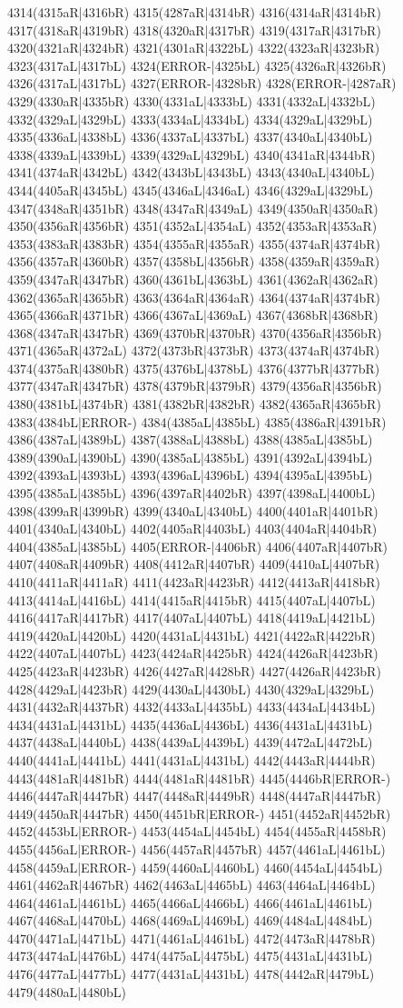 4314(4315aR|4316bR) 4315(4287aR|4314bR) 4316(4314aR|4314bR) 4317(4318aR|4319bR) 4318(4320aR|4317bR) 4319(4317aR|4317bR) 4320(4321aR|4324bR) 4321(4301aR|4322bL) 4322(4323aR|4323bR) 4323(4317aL|4317bL) 4324(ERROR-|4325bL) 4325(4326aR|4326bR) 4326(4317aL|4317bL) 4327(ERROR-|4328bR) 4328(ERROR-|4287aR) 4329(4330aR|4335bR) 4330(4331aL|4333bL) 4331(4332aL|4332bL) 4332(4329aL|4329bL) 4333(4334aL|4334bL) 4334(4329aL|4329bL) 4335(4336aL|4338bL) 4336(4337aL|4337bL) 4337(4340aL|4340bL) 4338(4339aL|4339bL) 4339(4329aL|4329bL) 4340(4341aR|4344bR) 4341(4374aR|4342bL) 4342(4343bL|4343bL) 4343(4340aL|4340bL) 4344(4405aR|4345bL) 4345(4346aL|4346aL) 4346(4329aL|4329bL) 4347(4348aR|4351bR) 4348(4347aR|4349aL) 4349(4350aR|4350aR) 4350(4356aR|4356bR) 4351(4352aL|4354aL) 4352(4353aR|4353aR) 4353(4383aR|4383bR) 4354(4355aR|4355aR) 4355(4374aR|4374bR) 4356(4357aR|4360bR) 4357(4358bL|4356bR) 4358(4359aR|4359aR) 4359(4347aR|4347bR) 4360(4361bL|4363bL) 4361(4362aR|4362aR) 4362(4365aR|4365bR) 4363(4364aR|4364aR) 4364(4374aR|4374bR) 4365(4366aR|4371bR) 4366(4367aL|4369aL) 4367(4368bR|4368bR) 4368(4347aR|4347bR) 4369(4370bR|4370bR) 4370(4356aR|4356bR) 4371(4365aR|4372aL) 4372(4373bR|4373bR) 4373(4374aR|4374bR) 4374(4375aR|4380bR) 4375(4376bL|4378bL) 4376(4377bR|4377bR) 4377(4347aR|4347bR) 4378(4379bR|4379bR) 4379(4356aR|4356bR) 4380(4381bL|4374bR) 4381(4382bR|4382bR) 4382(4365aR|4365bR) 4383(4384bL|ERROR-) 4384(4385aL|4385bL) 4385(4386aR|4391bR) 4386(4387aL|4389bL) 4387(4388aL|4388bL) 4388(4385aL|4385bL) 4389(4390aL|4390bL) 4390(4385aL|4385bL) 4391(4392aL|4394bL) 4392(4393aL|4393bL) 4393(4396aL|4396bL) 4394(4395aL|4395bL) 4395(4385aL|4385bL) 4396(4397aR|4402bR) 4397(4398aL|4400bL) 4398(4399aR|4399bR) 4399(4340aL|4340bL) 4400(4401aR|4401bR) 4401(4340aL|4340bL) 4402(4405aR|4403bL) 4403(4404aR|4404bR) 4404(4385aL|4385bL) 4405(ERROR-|4406bR) 4406(4407aR|4407bR) 4407(4408aR|4409bR) 4408(4412aR|4407bR) 4409(4410aL|4407bR) 4410(4411aR|4411aR) 4411(4423aR|4423bR) 4412(4413aR|4418bR) 4413(4414aL|4416bL) 4414(4415aR|4415bR) 4415(4407aL|4407bL) 4416(4417aR|4417bR) 4417(4407aL|4407bL) 4418(4419aL|4421bL) 4419(4420aL|4420bL) 4420(4431aL|4431bL) 4421(4422aR|4422bR) 4422(4407aL|4407bL) 4423(4424aR|4425bR) 4424(4426aR|4423bR) 4425(4423aR|4423bR) 4426(4427aR|4428bR) 4427(4426aR|4423bR) 4428(4429aL|4423bR) 4429(4430aL|4430bL) 4430(4329aL|4329bL) 4431(4432aR|4437bR) 4432(4433aL|4435bL) 4433(4434aL|4434bL) 4434(4431aL|4431bL) 4435(4436aL|4436bL) 4436(4431aL|4431bL) 4437(4438aL|4440bL) 4438(4439aL|4439bL) 4439(4472aL|4472bL) 4440(4441aL|4441bL) 4441(4431aL|4431bL) 4442(4443aR|4444bR) 4443(4481aR|4481bR) 4444(4481aR|4481bR) 4445(4446bR|ERROR-) 4446(4447aR|4447bR) 4447(4448aR|4449bR) 4448(4447aR|4447bR) 4449(4450aR|4447bR) 4450(4451bR|ERROR-) 4451(4452aR|4452bR) 4452(4453bL|ERROR-) 4453(4454aL|4454bL) 4454(4455aR|4458bR) 4455(4456aL|ERROR-) 4456(4457aR|4457bR) 4457(4461aL|4461bL) 4458(4459aL|ERROR-) 4459(4460aL|4460bL) 4460(4454aL|4454bL) 4461(4462aR|4467bR) 4462(4463aL|4465bL) 4463(4464aL|4464bL) 4464(4461aL|4461bL) 4465(4466aL|4466bL) 4466(4461aL|4461bL) 4467(4468aL|4470bL) 4468(4469aL|4469bL) 4469(4484aL|4484bL) 4470(4471aL|4471bL) 4471(4461aL|4461bL) 4472(4473aR|4478bR) 4473(4474aL|4476bL) 4474(4475aL|4475bL) 4475(4431aL|4431bL) 4476(4477aL|4477bL) 4477(4431aL|4431bL) 4478(4442aR|4479bL) 4479(4480aL|4480bL) 